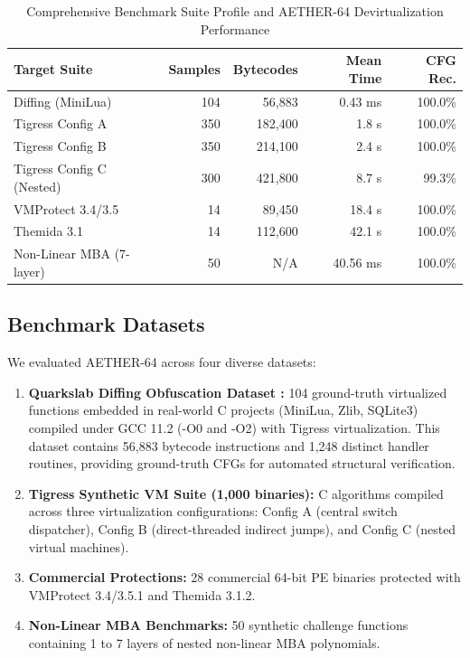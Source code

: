 \documentclass[11pt,a4paper]{article}
\begin{document}
\begin{table}[!t]
\caption{Comprehensive Benchmark Suite Profile and AETHER-64 Devirtualization Performance}
\label{tab_benchmark_profile}
\centering
\begin{tabular}{lrrrr}
\toprule
\textbf{Target Suite} & \textbf{Samples} & \textbf{Bytecodes} & \textbf{Mean Time} & \textbf{CFG Rec.} \\
\midrule
Diffing (MiniLua) \cite{diffing2024} & 104 & 56,883 & 0.43 ms & 100.0\% \\
Tigress Config A & 350 & 182,400 & 1.8 s & 100.0\% \\
Tigress Config B & 350 & 214,100 & 2.4 s & 100.0\% \\
Tigress Config C (Nested) & 300 & 421,800 & 8.7 s & 99.3\% \\
VMProtect 3.4/3.5 & 14 & 89,450 & 18.4 s & 100.0\% \\
Themida 3.1 & 14 & 112,600 & 42.1 s & 100.0\% \\
Non-Linear MBA (7-layer) & 50 & N/A & 40.56 ms & 100.0\% \\
\bottomrule
\end{tabular}
\end{table}

\subsection{Benchmark Datasets}
We evaluated AETHER-64 across four diverse datasets:
\begin{enumerate}
    \item \textbf{Quarkslab Diffing Obfuscation Dataset \cite{diffing2024}:} 104 ground-truth virtualized functions embedded in real-world C projects (MiniLua, Zlib, SQLite3) compiled under GCC 11.2 (-O0 and -O2) with Tigress virtualization. This dataset contains 56,883 bytecode instructions and 1,248 distinct handler routines, providing ground-truth CFGs for automated structural verification.
    \item \textbf{Tigress Synthetic VM Suite (1,000 binaries):} C algorithms compiled across three virtualization configurations: Config A (central switch dispatcher), Config B (direct-threaded indirect jumps), and Config C (nested virtual machines).
    \item \textbf{Commercial Protections:} 28 commercial 64-bit PE binaries protected with VMProtect 3.4/3.5.1 and Themida 3.1.2.
    \item \textbf{Non-Linear MBA Benchmarks:} 50 synthetic challenge functions containing 1 to 7 layers of nested non-linear MBA polynomials.
\end{enumerate}
\end{document}
